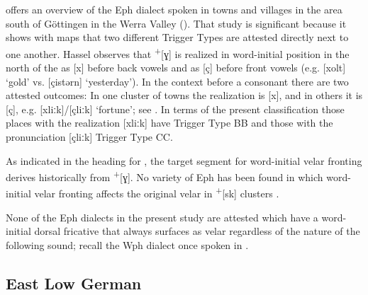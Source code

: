 \citet{Hassel1942} offers an overview of the Eph dialect spoken in towns and villages in the area south of Göttingen in the Werra Valley (). That study is significant because it shows with maps that two different Trigger Types are attested directly next to one another. Hassel observes that  \textsuperscript{+}[ɣ] is realized in word-initial position in the north of the  as [x] before back vowels and as [ç] before front vowels (e.g. [xolt] ‘gold’ vs. [çistərn] ‘yesterday’). In the context before a consonant there are two attested outcomes: In one cluster of towns the realization is [x], and in others it is [ç], e.g. [xliːk]/[çliːk] ‘fortune’; see \citet[65-67]{Hassel1942}. In terms of the present classification those places with the realization [xliːk] have Trigger Type BB and those with the pronunciation [çliːk] Trigger Type CC.

As indicated in the heading for , the target segment for word-initial velar fronting derives historically from  \textsuperscript{+}[ɣ]. No variety of Eph has been found in which word-initial velar fronting affects the original velar in  \textsuperscript{+}[sk] clusters \citep{Hall2021}.

None of the Eph dialects in the present study are attested which have a word-initial dorsal fricative that always surfaces as velar regardless of the nature of the following sound; recall the Wph dialect once spoken in  \citep{Wix1921}.

\subsection{East Low German}\label{sec:12.3.7}
